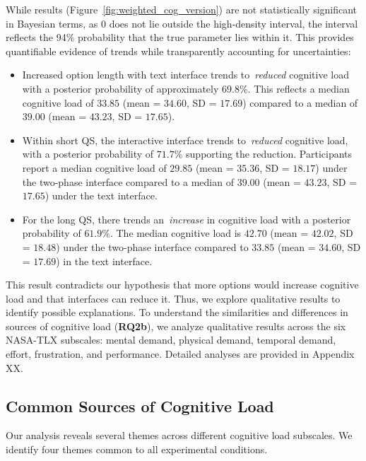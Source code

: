 While results (Figure~\ref{fig:weighted_cog_version}) are not statistically significant in Bayesian terms, as 0 does not lie outside the high-density interval, the interval reflects the 94\% probability that the true parameter lies within it. This provides quantifiable evidence of trends while transparently accounting for uncertainties:
\begin{itemize}
    \item Increased option length with text interface trends to~\textit{reduced} cognitive load with a posterior probability of approximately $69.8\%$. This reflects a median cognitive load of $33.85$ (mean = $34.60$, SD = $17.69$) compared to a median of $39.00$ (mean = $43.23$, SD = $17.65$).
    \item Within short QS, the interactive interface trends to~\textit{reduced} cognitive load, with a posterior probability of $71.7\%$ supporting the reduction. Participants report a median cognitive load of $29.85$ (mean = $35.36$, SD = $18.17$) under the two-phase interface compared to a median of $39.00$ (mean = $43.23$, SD = $17.65$) under the text interface.
    \item For the long QS, there trends an~\textit{increase} in cognitive load with a posterior probability of $61.9\%$. The median cognitive load is $42.70$ (mean = $42.02$, SD = $18.48$) under the two-phase interface compared to $33.85$ (mean = $34.60$, SD = $17.69$) in the text interface.
\end{itemize}

This result contradicts our hypothesis that more options would increase cognitive load and that interfaces can reduce it. Thus, we explore qualitative results to identify possible explanations. To understand the similarities and differences in sources of cognitive load (\textbf{RQ2b}), we analyze qualitative results across the six NASA-TLX subscales: mental demand, physical demand, temporal demand, effort, frustration, and performance. Detailed analyses are provided in Appendix XX.

\subsection{Common Sources of Cognitive Load}
\label{sec:cog_common}
Our analysis reveals several themes across different cognitive load subscales. We identify four themes common to all experimental conditions.

